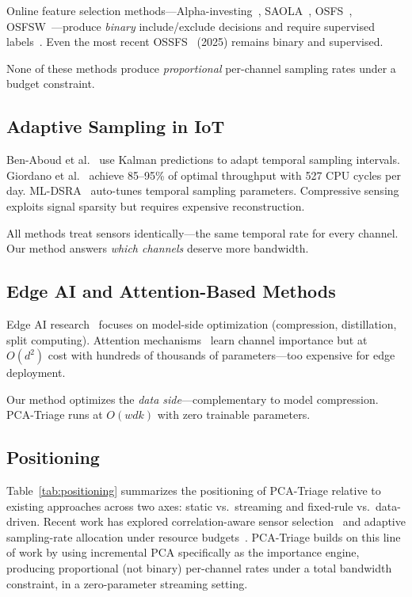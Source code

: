 \documentclass[journal]{IEEEtran}
\begin{document}
Online feature selection methods---Alpha-investing~\cite{zhou2006alpha}, SAOLA~\cite{yu2014saola}, OSFS~\cite{wu2013osfs}, OSFSW~\cite{you2018osfsw}---produce \textit{binary} include/exclude decisions and require supervised labels~\cite{zaman2022streaming}. Even the most recent OSSFS~\cite{zhou2025ossfs} (2025) remains binary and supervised.

None of these methods produce \textit{proportional} per-channel sampling rates under a budget constraint.

\subsection{Adaptive Sampling in IoT}

Ben-Aboud et al.~\cite{benaboud2021adaptive} use Kalman predictions to adapt temporal sampling intervals. Giordano et al.~\cite{giordano2023energy} achieve 85--95\% of optimal throughput with 527 CPU cycles per day. ML-DSRA~\cite{mldsra2024parametric} auto-tunes temporal sampling parameters. Compressive sensing~\cite{cs2017survey} exploits signal sparsity but requires expensive reconstruction.

All methods treat sensors identically---the same temporal rate for every channel. Our method answers \textit{which channels} deserve more bandwidth.

\subsection{Edge AI and Attention-Based Methods}

Edge AI research~\cite{gill2024edgeai} focuses on model-side optimization (compression, distillation, split computing). Attention mechanisms~\cite{cao2021mafs, vtt2024transformer, xu2023dcff} learn channel importance but at $O(d^2)$ cost with hundreds of thousands of parameters---too expensive for edge deployment.

Our method optimizes the \textit{data side}---complementary to model compression. PCA-Triage runs at $O(wdk)$ with zero trainable parameters.

\subsection{Positioning}

Table~\ref{tab:positioning} summarizes the positioning of PCA-Triage relative to existing approaches across two axes: static vs.\ streaming and fixed-rule vs.\ data-driven. Recent work has explored correlation-aware sensor selection~\cite{bacciu2016unsupervised, ghosh2021adaptive, ghosh2021edge} and adaptive sampling-rate allocation under resource budgets~\cite{yang2023freqsense}. PCA-Triage builds on this line of work by using incremental PCA specifically as the importance engine, producing proportional (not binary) per-channel rates under a total bandwidth constraint, in a zero-parameter streaming setting.
\end{document}
